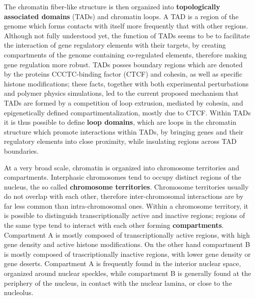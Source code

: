 
The chromatin fiber-like structure is then organized into \textbf{topologically associated domains} (TADs) and chromatin loops. A TAD is a region of the genome which forms contacts with itself more frequently that with other regions. Although not fully understood yet, the function of TADs seems to be to facilitate the interaction of gene regulatory elements with their targets, by creating compartments of the genome containing co-regulated elements, therefore making gene regulation more robust\cite{tadrole2018}. TADs posses boundary regions which are denoted by the proteins CCCTC-binding factor (CTCF) and cohesin, as well as specific histone modifications\cite{chromatindevelopment2019}; these facts, together with both experimental perturbations and polymer physics simulations, led to the current proposed mechanism that TADs are formed by a competition of loop extrusion, mediated by cohesin, and epigenetically defined compartimentalization, mostly due to CTCF\cite{tadformation2018}. Within TADs it is thus possible to define \textbf{loop domains}, which are loops in the chromatin structure which promote interactions within TADs, by bringing genes and their regulatory elements into close proximity, while insulating regions across TAD boundaries\cite{chromatindevelopment2019}. 

At a very broad scale, chromatin is organized into chromosome territories and compartments. Interphasic chromosomes tend to occupy distinct regions of the nucleus, the so called \textbf{chromosome territories}\cite{chromosometerritories2010}. Chromosome territories usually do not overlap with each other, therefore inter-chromosomal interactions are by far less common than intra-chromosomal ones. Within a chromosome territory, it is possible to distinguish transcriptionally active and inactive regions; regions of the same type tend to interact with each other forming \textbf{compartments}. Compartment A is mostly composed of transcriptionally active regions, with high gene density and active histone modifications. On the other hand compartment B is mostly composed of trascriptionally inactive regions, with lower gene density or gene deserts\cite{chromatindevelopment2019}. Compartment A is frequently found in the interior nuclear space, organized around nuclear speckles, while compartment B is generally found at the periphery of the nucleus, in contact with the nuclear lamina, or close to the nucleolus\cite{chromatinorganization2019, chromatindevelopment2019}.

